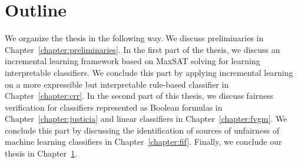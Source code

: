 \section{Outline}
We organize the thesis in the following way. We discuss preliminaries in Chapter~\ref{chapter:preliminaries}. In the first part of the thesis, we discuss an incremental learning framework based on MaxSAT solving for learning interpretable classifiers. We conclude this part by applying incremental learning on a more expressible but interpretable rule-based classifier in Chapter~\ref{chapter:crr}. In the second part of this thesis, we discuss  fairness verification for classifiers represented as Boolean formulas in Chapter~\ref{chapter:justicia} and linear classifiers in Chapter~\ref{chapter:fvgm}. We conclude this part by discussing the identification of sources of unfairness of machine learning classifiers in Chapter~\ref{chapter:fif}. Finally, we conclude our thesis in Chapter~\ref{}.


